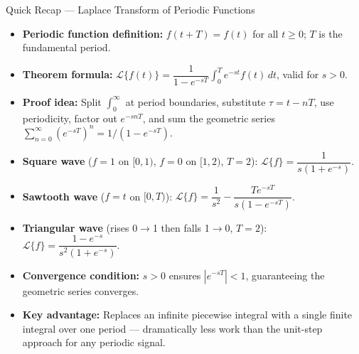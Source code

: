 \documentclass[12pt,a4paper]{article}
\begin{document}
\begin{learnbox}{Quick Recap --- Laplace Transform of Periodic Functions}
\begin{itemize}[noitemsep]
  \item \textbf{Periodic function definition:} $f(t+T) = f(t)$ for all
        $t \ge 0$; $T$ is the fundamental period.
  \item \textbf{Theorem formula:}
        $\mathcal{L}\{f(t)\} = \dfrac{1}{1-e^{-sT}}\displaystyle\int_0^T
        e^{-st}f(t)\,dt$, valid for $s > 0$.
  \item \textbf{Proof idea:} Split $\int_0^\infty$ at period boundaries,
        substitute $\tau = t - nT$, use periodicity, factor out $e^{-snT}$,
        and sum the geometric series $\sum_{n=0}^{\infty}(e^{-sT})^n =
        1/(1-e^{-sT})$.
  \item \textbf{Square wave} ($f=1$ on $[0,1)$, $f=0$ on $[1,2)$, $T=2$):
        $\mathcal{L}\{f\} = \dfrac{1}{s(1+e^{-s})}$.
  \item \textbf{Sawtooth wave} ($f=t$ on $[0,T)$):
        $\mathcal{L}\{f\} = \dfrac{1}{s^2} - \dfrac{Te^{-sT}}{s(1-e^{-sT})}$.
  \item \textbf{Triangular wave} (rises 0$\to$1 then falls 1$\to$0, $T=2$):
        $\mathcal{L}\{f\} = \dfrac{1-e^{-s}}{s^2(1+e^{-s})}$.
  \item \textbf{Convergence condition:} $s > 0$ ensures $|e^{-sT}| < 1$,
        guaranteeing the geometric series converges.
  \item \textbf{Key advantage:} Replaces an infinite piecewise integral with
        a single finite integral over one period --- dramatically less work than
        the unit-step approach for any periodic signal.
\end{itemize}
\end{learnbox}
\end{document}
